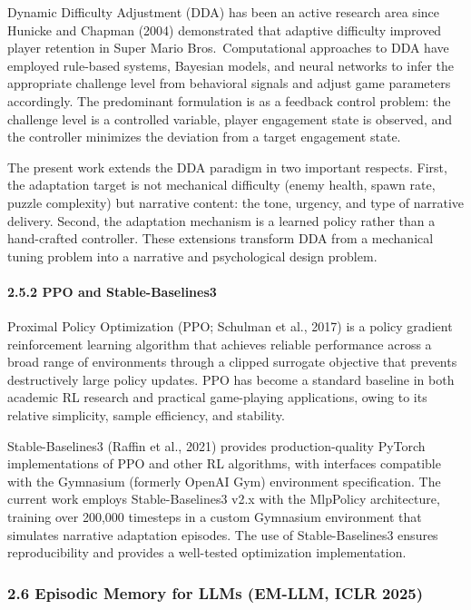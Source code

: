 Dynamic Difficulty Adjustment (DDA) has been an active research area
since Hunicke and Chapman (2004) demonstrated that adaptive difficulty
improved player retention in Super Mario Bros.~Computational approaches
to DDA have employed rule-based systems, Bayesian models, and neural
networks to infer the appropriate challenge level from behavioral
signals and adjust game parameters accordingly. The predominant
formulation is as a feedback control problem: the challenge level is a
controlled variable, player engagement state is observed, and the
controller minimizes the deviation from a target engagement state.

The present work extends the DDA paradigm in two important respects.
First, the adaptation target is not mechanical difficulty (enemy health,
spawn rate, puzzle complexity) but narrative content: the tone, urgency,
and type of narrative delivery. Second, the adaptation mechanism is a
learned policy rather than a hand-crafted controller. These extensions
transform DDA from a mechanical tuning problem into a narrative and
psychological design problem.

\paragraph{2.5.2 PPO and
Stable-Baselines3}\label{ppo-and-stable-baselines3}

Proximal Policy Optimization (PPO; Schulman et al., 2017) is a policy
gradient reinforcement learning algorithm that achieves reliable
performance across a broad range of environments through a clipped
surrogate objective that prevents destructively large policy updates.
PPO has become a standard baseline in both academic RL research and
practical game-playing applications, owing to its relative simplicity,
sample efficiency, and stability.

Stable-Baselines3 (Raffin et al., 2021) provides production-quality
PyTorch implementations of PPO and other RL algorithms, with interfaces
compatible with the Gymnasium (formerly OpenAI Gym) environment
specification. The current work employs Stable-Baselines3 v2.x with the
MlpPolicy architecture, training over 200,000 timesteps in a custom
Gymnasium environment that simulates narrative adaptation episodes. The
use of Stable-Baselines3 ensures reproducibility and provides a
well-tested optimization implementation.

\subsubsection{2.6 Episodic Memory for LLMs (EM-LLM, ICLR
2025)}\label{episodic-memory-for-llms-em-llm-iclr-2025}

